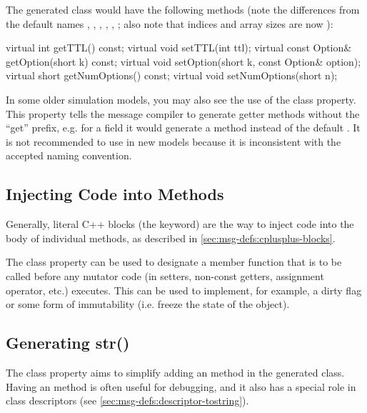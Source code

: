 The generated class would have the following methods (note the differences
from the default names , , ,
, , ;
also note that indices and array sizes are now ):

\begin{cpp}
virtual int getTTL() const;
virtual void setTTL(int ttl);
virtual const Option& getOption(short k) const;
virtual void setOption(short k, const Option& option);
virtual short getNumOptions() const;
virtual void setNumOptions(short n);
\end{cpp}

In some older simulation models, you may also see the use of the
 class property. This property tells the message
compiler to generate getter methods without the ``get'' prefix, e.g. for a
 field it would generate a  method
instead of the default . It is not recommended to
use  in new models because it is inconsistent with the
accepted naming convention.



\subsection{Injecting Code into Methods}
\label{sec:msg-defs:injecting-code-into-methods}

Generally, literal C++ blocks (the  keyword) are the way to
inject code into the body of individual methods, as described in
\ref{sec:msg-defs:cplusplus-blocks}.

The  class property can be used to designate a member function
that is to be called before any mutator code (in setters, non-const getters,
assignment operator, etc.) executes. This can be used to implement, for example, a dirty
flag or some form of immutability (i.e. freeze the state of the object).


\subsection{Generating str()}
\label{sec:msg-defs:generating-str-method}

The  class property aims to simplify adding an 
method in the generated class. Having an  method is often useful
for debugging, and it also has a special role in class descriptors (see
\ref{sec:msg-defs:descriptor-tostring}).

